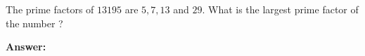 \documentclass{experimento}
\begin{document}
The prime factors of $13195$ are $5, 7, 13$ and $29$.
What is the largest prime factor of the number ? \par
  
{\bfseries Answer:}\par
\end{document}
